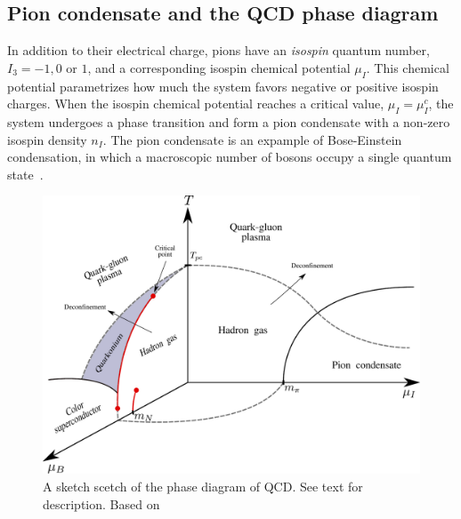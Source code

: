 \subsection*{Pion condensate and the QCD phase diagram}

In addition to their electrical charge, pions have an \emph{isospin} quantum number, $I_3 = -1, 0$ or $1$, and a corresponding isospin chemical potential $\mu_I$.
This chemical potential parametrizes how much the system favors negative or positive isospin charges.
When the isospin chemical potential reaches a critical value, $\mu_I = \mu_I^c$, the system undergoes a phase transition and form a pion condensate with a non-zero isospin density $n_I$.
The pion condensate is an expample of Bose-Einstein condensation, in which a macroscopic number of bosons occupy a single quantum state~\cite{Brandt:QCD_phase_diagram_with_isospin_chemical_potential,Brandt:QCD_phase_diagram_for_nonzero_isospin-asymmetry,mannarelli:meson_condensation}.

\begin{figure}[ht]
    \centering
    \includegraphics[width=\textwidth]{figurer/phase_diagram2.pdf}
    \caption{A sketch scetch of the phase diagram of QCD. See text for description. Based on~\cite{from_hadrons_to_quarks,
            Brandt:QCD_phase_diagram_with_isospin_chemical_potential,Brandt:QCD_phase_diagram_for_nonzero_isospin-asymmetry,Fukushima:The_phase_diagram_of_dense_QCD,mannarelli:meson_condensation,alford:color_superconductivity}
    }
    \label{fig:phase diag qcd}
\end{figure}

